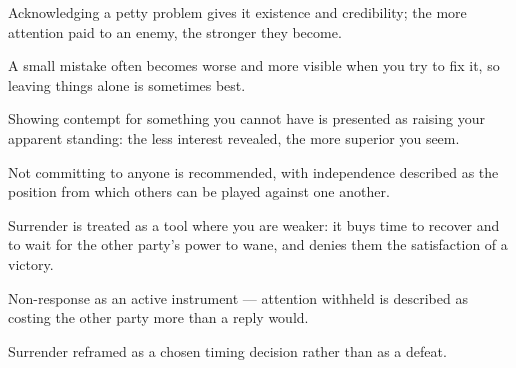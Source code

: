

\begin{distilled}
  \item Acknowledging a petty problem gives it existence and credibility; the more attention paid to an enemy, the stronger they become.
  \item A small mistake often becomes worse and more visible when you try to fix it, so leaving things alone is sometimes best.
  \item Showing contempt for something you cannot have is presented as raising your apparent standing: the less interest revealed, the more superior you seem.
  \item Not committing to anyone is recommended, with independence described as the position from which others can be played against one another.
  \item Surrender is treated as a tool where you are weaker: it buys time to recover and to wait for the other party's power to wane, and denies them the satisfaction of a victory.
\end{distilled}

\begin{unique}
  \item Non-response as an active instrument --- attention withheld is described as costing the other party more than a reply would.
  \item Surrender reframed as a chosen timing decision rather than as a defeat.
\end{unique}
